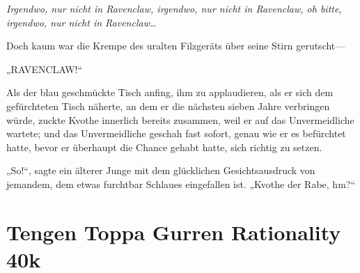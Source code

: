 \emph{Irgendwo, nur nicht in Ravenclaw, irgendwo, nur nicht in Ravenclaw, oh bitte, irgendwo, nur nicht in Ravenclaw…}

Doch kaum war die Krempe des uralten Filzgeräts über seine Stirn gerutscht—

„RAVENCLAW!“

Als der blau geschmückte Tisch anfing, ihm zu applaudieren, als er sich dem gefürchteten Tisch näherte, an dem er die nächsten sieben Jahre verbringen würde, zuckte Kvothe innerlich bereits zusammen, weil er auf das Unvermeidliche wartete; und das Unvermeidliche geschah fast sofort, genau wie er es befürchtet hatte, bevor er überhaupt die Chance gehabt hatte, sich richtig zu setzen.

„So!“, sagte ein älterer Junge mit dem glücklichen Gesichtsausdruck von jemandem, dem etwas furchtbar Schlaues eingefallen ist. „Kvothe der Rabe, hm?“

\section{Tengen Toppa Gurren Rationality 40k}

